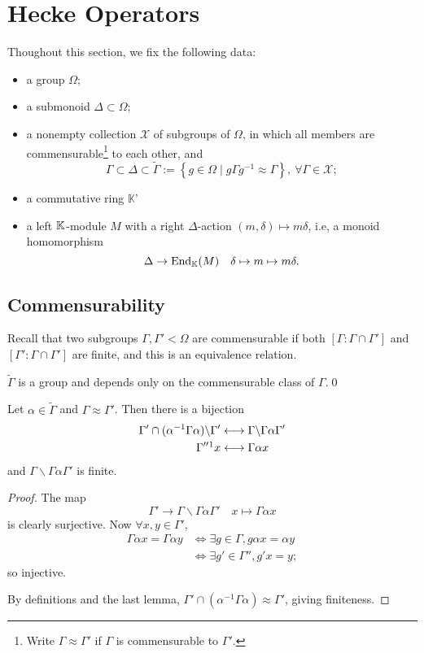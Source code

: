 \section{Hecke Operators}
Thoughout this section, we fix the following data:\begin{itemize}
    \item a group $\Omega$;
    \item a submonoid $\Delta\subset\Omega$;
    \item a nonempty collection $\mathscr{X}$ of subgroups of $\Omega$, in which all members are commensurable\footnote{Write $\Gamma\approx \Gamma'$ if $\Gamma$ is commensurable to $\Gamma'$.} to each other, 
    and \[\Gamma\subset\Delta\subset\tilde\Gamma := \left\{ g\in\Omega \mid g\Gamma g^{-1}\approx\Gamma \right\},\ \forall \Gamma\in\mathscr{X};\]
    \item a commutative ring $\mathbb K$'
    \item a left $\mathbb{K}$-module $M$ with a right $\Delta$-action $(m, \delta)\mapsto m\delta$, i.e, a monoid homomorphism \[\Delta\to\operatorname{End}_{\mathbb{K}}(M)\quad \delta\mapsto m\mapsto m\delta.\]
\end{itemize}

\subsection{Commensurability}
Recall that two subgroups $\Gamma, \Gamma' < \Omega$ are commensurable if both $[\Gamma : \Gamma\cap\Gamma']$ and $[\Gamma' : \Gamma\cap\Gamma']$ are finite,
and this is an equivalence relation.

\begin{lemma}
    $\tilde{\Gamma}$ is a group and depends only on the commensurable class of $\Gamma$.\qed
\end{lemma}

\begin{proposition}
    Let $\alpha\in\tilde{\Gamma}$ and $\Gamma\approx\Gamma'$.
    Then there is a bijection
    \begin{align*}
        \Gamma'\cap (\alpha^{-1}\Gamma\alpha) \backslash \Gamma'
        &\longleftrightarrow \Gamma\backslash\Gamma\alpha\Gamma'\\
        \Gamma''\footnotemark x&\longleftrightarrow \Gamma\alpha x
    \end{align*}
    and $\Gamma\backslash\Gamma\alpha\Gamma'$ is finite.
\end{proposition}
\begin{proof}
    The map \[\Gamma'\to \Gamma\backslash\Gamma\alpha\Gamma'\quad x\mapsto \Gamma\alpha x\]
    is clearly surjective.
    Now $\forall x, y\in\Gamma'$,\begin{align*}
        \Gamma\alpha x = \Gamma\alpha y&\iff \exists g\in\Gamma, g\alpha x= \alpha y\\
        &\iff\exists g'\in\Gamma'', g'x = y;
    \end{align*}
    so injective.

    By definitions and the last lemma, $\Gamma'\cap (\alpha^{-1}\Gamma\alpha)\approx \Gamma'$, giving finiteness.
\end{proof}


